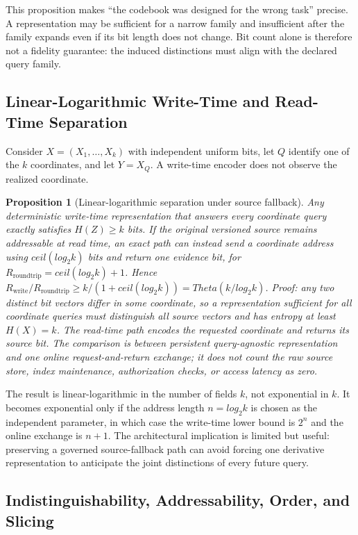 \documentclass[11pt]{article}
\newtheorem{proposition}{Proposition}
\begin{document}
This proposition makes ``the codebook was designed for the wrong task'' precise. A representation may be sufficient for a narrow family and insufficient after the family expands even if its bit length does not change. Bit count alone is therefore not a fidelity guarantee: the induced distinctions must align with the declared query family.

\subsection{Linear-Logarithmic Write-Time and Read-Time Separation}

Consider $X=(X_1,\ldots,X_k)$ with independent uniform bits, let $Q$ identify one of the $k$ coordinates, and let $Y=X_Q$. A write-time encoder does not observe the realized coordinate.

\begin{proposition}[Linear-logarithmic separation under source fallback]
Any deterministic write-time representation that answers every coordinate query exactly satisfies $H(Z)\geq k$ bits. If the original versioned source remains addressable at read time, an exact path can instead send a coordinate address using $ceil(log_2 k)$ bits and return one evidence bit, for $R_{\mathrm{roundtrip}}=ceil(log_2 k)+1$. Hence
$R_{\mathrm{write}}/R_{\mathrm{roundtrip}}\geq k/(1+ceil(log_2 k))=Theta(k/log_2 k)$.
Proof: any two distinct bit vectors differ in some coordinate, so a representation sufficient for all coordinate queries must distinguish all source vectors and has entropy at least $H(X)=k$. The read-time path encodes the requested coordinate and returns its source bit. The comparison is between persistent query-agnostic representation and one online request-and-return exchange; it does not count the raw source store, index maintenance, authorization checks, or access latency as zero.
\end{proposition}

The result is linear-logarithmic in the number of fields $k$, not exponential in $k$. It becomes exponential only if the address length $n=log_2 k$ is chosen as the independent parameter, in which case the write-time lower bound is $2^n$ and the online exchange is $n+1$. The architectural implication is limited but useful: preserving a governed source-fallback path can avoid forcing one derivative representation to anticipate the joint distinctions of every future query.

\subsection{Indistinguishability, Addressability, Order, and Slicing}
\end{document}
